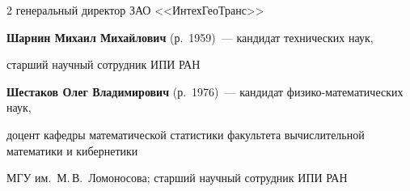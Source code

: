\begin{multicols}{2}
генеральный директор ЗАО <<ИнтехГеоТранс>>



\vspace*{6pt}



\noindent

\textbf{Шарнин Михаил Михайлович} (р.\ 1959)~--- кандидат технических наук, 

старший научный сотрудник ИПИ РАН



\vspace*{6pt}



\noindent

\textbf{Шестаков Олег Владимирович} (р.\ 1976)~--- кандидат фи\-зи\-ко-математических наук,

доцент ка\-фед\-ры математической статистики факультета вычислительной математики и кибернетики

МГУ им.~М.\,В.~Ломоносова; старший научный сотрудник ИПИ РАН





\def\leftfootline{\small{\textbf{\thepage}

\hfill ИНФОРМАТИКА И ЕЁ ПРИМЕНЕНИЯ\ \ \ том~6\ \ \ выпуск~2\ \ \ 2012}

}%

 \def\rightfootline{\small{ИНФОРМАТИКА И ЕЁ ПРИМЕНЕНИЯ\ \ \ том~6\ \ \ выпуск~2\ \ \ 2012

\hfill \textbf{\thepage}}}





\end{multicols}



\newpage

